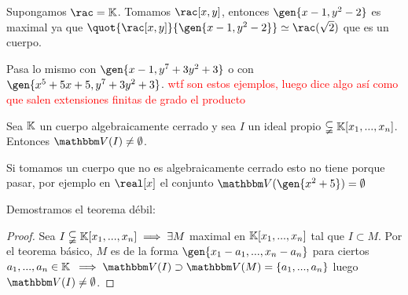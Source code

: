 \obs Supongamos $\rac = \K$. Tomamos $\rac[x,y]$, entonces $\gen{x-1,y^2-2}$ es maximal ya que $\quot{\rac[x,y]}{\gen{x-1,y^2-2}} \simeq \rac(\sqrt{2})$  que es un cuerpo.

Pasa lo mismo con $\gen{x-1,y^7+3y^2+3}$ o con $\gen{x^5+5x+5, y^7+3y^2+3}$. \textcolor{red}{wtf son estos ejemplos, luego dice algo así como que salen extensiones finitas de grado el producto}

\begin{theorem} \label{thm:Debil}
	Sea $\mathbb{K}$ un cuerpo algebraicamente cerrado y sea $I$ un ideal propio $\subsetneqq \mathbb{K}[x_1,...,x_n]$. Entonces $\V(I) \neq \emptyset$.
\end{theorem}

\obs Si tomamos un cuerpo que no es algebraicamente cerrado esto no tiene porque pasar, por ejemplo en $\real[x]$ el conjunto $\V(\gen{x^2+5})=\emptyset$


Demostramos el teorema débil:
\begin{proof}
	Sea $I \subsetneqq \mathbb{K}[x_1,...,x_n] \implies \exists M$ maximal en $\mathbb{K}[x_1,...,x_n]$ tal que $I \subset M$. Por el teorema básico, $M$ es de la forma $\gen{x_1-a_1,...,x_n-a_n}$ para ciertos $a_1,...,a_n \in \mathbb{K}$ $\implies \V(I) \supset \V(M)=\{a_1,...,a_n\}$ luego $\V(I)\neq \emptyset$.
\end{proof}



